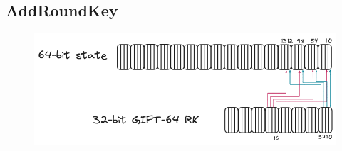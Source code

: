 \subsection{AddRoundKey}

\begin{figure}[h!]\centering
\includegraphics[scale=.6]{image/round_fn.png}
\end{figure}
